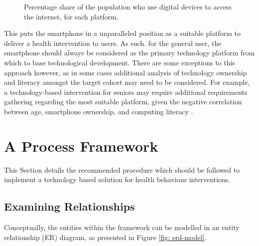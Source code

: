 \begin{figure}[h]
	\caption{Percentage share of the population who use digital devices to access the internet, for each platform.}
    \label{fig: graph-internetuse}
\end{figure}

This puts the smartphone in a unparalleled position as a suitable platform to deliver a health intervention to users. As such. for the general user, the smartphone should always be considered as the primary technology platform from which to base technological development.
There are some exceptions to this approach however, as in some cases additional analysis of technology ownership and literacy amongst the target cohort may need to be considered. For example, a technology-based intervention for seniors may require additional requirements gathering regarding the most suitable platform, given the negative correlation between age, smartphone ownership, and computing literacy \cite{Migo2015}.

\section{A Process Framework}
This Section details the recommended procedure which should be followed to implement a technology based solution for health behaviour interventions.

\subsection{Examining Relationships}
Conceptually, the entities within the framework can be modelled in an entity relationship (ER) diagram, as presented in Figure \ref{fig: erd-model}.

